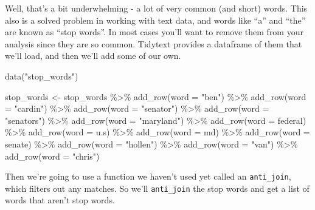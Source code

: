 \documentclass[
  letterpaper,
  DIV=11,
  numbers=noendperiod]{scrreprt}
\newenvironment{Shaded}{\begin{snugshade}}{\end{snugshade}}
\newcommand{\AttributeTok}[1]{\textcolor[rgb]{0.40,0.45,0.13}{#1}}
\newcommand{\FunctionTok}[1]{\textcolor[rgb]{0.28,0.35,0.67}{#1}}
\newcommand{\NormalTok}[1]{\textcolor[rgb]{0.00,0.23,0.31}{#1}}
\newcommand{\OtherTok}[1]{\textcolor[rgb]{0.00,0.23,0.31}{#1}}
\newcommand{\SpecialCharTok}[1]{\textcolor[rgb]{0.37,0.37,0.37}{#1}}
\newcommand{\StringTok}[1]{\textcolor[rgb]{0.13,0.47,0.30}{#1}}
\begin{document}
Well, that's a bit underwhelming - a lot of very common (and short)
words. This also is a solved problem in working with text data, and
words like ``a'' and ``the'' are known as ``stop words''. In most cases
you'll want to remove them from your analysis since they are so common.
Tidytext provides a dataframe of them that we'll load, and then we'll
add some of our own.

\begin{Shaded}
\begin{Highlighting}[]
\FunctionTok{data}\NormalTok{(}\StringTok{"stop\_words"}\NormalTok{)}

\NormalTok{stop\_words }\OtherTok{\textless{}{-}}\NormalTok{ stop\_words }\SpecialCharTok{\%\textgreater{}\%} 
  \FunctionTok{add\_row}\NormalTok{(}\AttributeTok{word =} \StringTok{"ben"}\NormalTok{) }\SpecialCharTok{\%\textgreater{}\%} 
  \FunctionTok{add\_row}\NormalTok{(}\AttributeTok{word =} \StringTok{"cardin"}\NormalTok{) }\SpecialCharTok{\%\textgreater{}\%} 
  \FunctionTok{add\_row}\NormalTok{(}\AttributeTok{word =} \StringTok{"senator"}\NormalTok{) }\SpecialCharTok{\%\textgreater{}\%}
  \FunctionTok{add\_row}\NormalTok{(}\AttributeTok{word =} \StringTok{"senators"}\NormalTok{) }\SpecialCharTok{\%\textgreater{}\%}
  \FunctionTok{add\_row}\NormalTok{(}\AttributeTok{word =} \StringTok{"maryland"}\NormalTok{) }\SpecialCharTok{\%\textgreater{}\%}
  \FunctionTok{add\_row}\NormalTok{(}\AttributeTok{word =} \StringTok{\textquotesingle{}federal\textquotesingle{}}\NormalTok{) }\SpecialCharTok{\%\textgreater{}\%} 
  \FunctionTok{add\_row}\NormalTok{(}\AttributeTok{word =} \StringTok{\textquotesingle{}u.s\textquotesingle{}}\NormalTok{) }\SpecialCharTok{\%\textgreater{}\%} 
  \FunctionTok{add\_row}\NormalTok{(}\AttributeTok{word =} \StringTok{\textquotesingle{}md\textquotesingle{}}\NormalTok{) }\SpecialCharTok{\%\textgreater{}\%} 
  \FunctionTok{add\_row}\NormalTok{(}\AttributeTok{word =} \StringTok{\textquotesingle{}senate\textquotesingle{}}\NormalTok{) }\SpecialCharTok{\%\textgreater{}\%} 
  \FunctionTok{add\_row}\NormalTok{(}\AttributeTok{word =} \StringTok{"hollen"}\NormalTok{) }\SpecialCharTok{\%\textgreater{}\%} 
  \FunctionTok{add\_row}\NormalTok{(}\AttributeTok{word =} \StringTok{"van"}\NormalTok{) }\SpecialCharTok{\%\textgreater{}\%} 
  \FunctionTok{add\_row}\NormalTok{(}\AttributeTok{word =} \StringTok{"chris"}\NormalTok{)}
\end{Highlighting}
\end{Shaded}

Then we're going to use a function we haven't used yet called an
\texttt{anti\_join}, which filters out any matches. So we'll
\texttt{anti\_join} the stop words and get a list of words that aren't
stop words.
\end{document}
